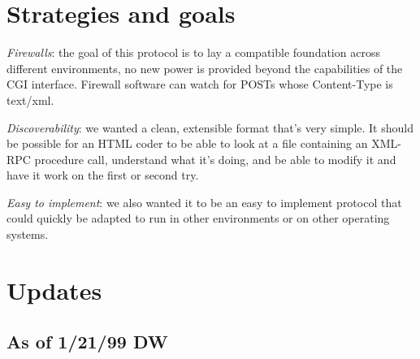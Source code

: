 %
%

\section{Strategies and goals}

\emph{Firewalls}: the goal of this protocol is to lay a compatible foundation across different environments, no new power is provided beyond the capabilities of the CGI interface. Firewall software can watch for POSTs whose Content-Type is text/xml.

\emph{Discoverability}: we wanted a clean, extensible format that's very simple. It should be possible for an HTML coder to be able to look at a file containing an XML-RPC procedure call, understand what it's doing, and be able to modify it and have it work on the first or second try.

\emph{Easy to implement}: we also wanted it to be an easy to implement protocol that could quickly be adapted to run in other environments or on other operating systems.


%
%

\section{Updates}

\subsection{As of 1/21/99 DW}

